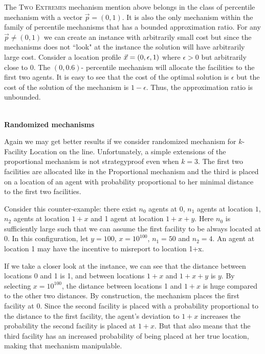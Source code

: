 The \textsc{Two Extremes} mechanism mention above belongs in the class of percentile mechanism with a vector $\vec{p}=(0,1)$. It is also the only mechanism within the family of percentile mechanisms that has a bounded approximation ratio. For any $\vec{p}\neq (0,1)$ we can create an instance with arbitrarily small cost but since the mechanisms does not ``look" at the instance the solution will have arbitrarily large cost. Consider a location profile $\vec{x}=(0,\epsilon,1)$ where $\epsilon>0$ but arbitrarily close to $0$. The $(0,0.6)$- percentile mechanism will allocate the facilities to the first two agents. It is easy to see that the cost of the optimal solution is $\epsilon$ but the cost of the solution of the mechanism is $1-\epsilon$. Thus, the approximation ratio is unbounded.

~\\\textbf{Randomized mechanisms}

Again we may get better results if we consider randomized mechanism for $k$-Facility Location on the line. Unfortunately, a simple extensions of the proportional mechanism is not strategyproof even when $k=3$. The first two facilities are allocated like in the Proportional mechanism and the third is placed on a location of an agent with probability proportional to her minimal distance to the first two facilities. 

Consider this counter-example: there exist $n_0$ agents at $0$, $n_1$ agents at location $1$, $n_2$ agents at location $1+x$ and 1 agent at location $1+x+y$. Here $n_0$ is sufficiently large such that we can assume the first facility to be always located at $0$. In this configuration, let $y=100$, $x=10^{100}$, $n_1=50$ and $n_2=4$. An agent at location 1 may have the incentive to misreport to location 1+x. 

If we take a closer look at the instance, we can see that the distance between locations 0 and 1 is 1, and between locations $1+x$ and $1+x+y$ is $y$. By selecting $x=10^{100}$, the distance between locations 1 and $1+x$ is huge compared to the other two distances. By construction, the mechanism places the first facility at 0. Since the second facility is placed with a probability proportional to the distance to the first facility, the agent's deviation to $1+x$ increases the probability the second facility is placed at $1+x$. But that also means that the third facility  has an increased probability of being placed  at her true location, making that mechanism manipulable.




